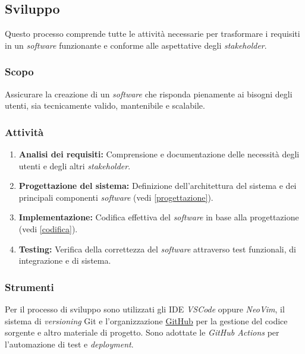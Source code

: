 \subsection{Sviluppo}

Questo processo comprende tutte le attività necessarie per trasformare i
requisiti in un \textit{software} funzionante e conforme alle aspettative degli
\textit{stakeholder}.

\subsubsection{Scopo}
Assicurare la creazione di un \textit{software} che risponda pienamente ai
bisogni degli utenti, sia tecnicamente valido, mantenibile e scalabile.

\subsubsection{Attività}
\begin{enumerate}
	\item \textbf{Analisi dei requisiti:} Comprensione e documentazione delle
	      necessità degli utenti e degli altri \textit{stakeholder}.
	\item \textbf{Progettazione del sistema:} Definizione dell'architettura del
	      sistema e dei principali componenti \textit{software} (vedi
	      \cref{progettazione}).
	\item \textbf{Implementazione:} Codifica effettiva del \textit{software} in
	      base alla progettazione (vedi \cref{codifica}).
	\item \textbf{Testing:} Verifica della correttezza del \textit{software}
	      attraverso test funzionali, di integrazione e di sistema.
\end{enumerate}

\subsubsection{Strumenti}
Per il processo di sviluppo sono utilizzati gli IDE \textit{VSCode} oppure
\textit{NeoVim}, il sistema di \textit{versioning} Git e l'organizzazione
\href{https://GitHub\g.com/Project-SWEnergy}{GitHub\g} per la gestione del codice
sorgente e altro materiale di progetto. Sono adottate le \textit{GitHub Actions}
per l'automazione di test e \textit{deployment}.
